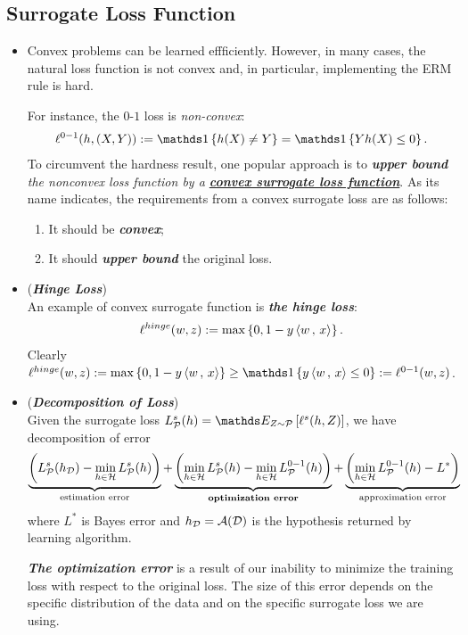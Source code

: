 \documentclass[11pt]{article}
\begin{document}
\subsection{Surrogate Loss Function}
\begin{itemize}
\item \begin{remark}
Convex problems can be learned effficiently. However, in many cases, the natural loss function is not convex and, in particular, implementing the ERM rule is hard.

For instance, the $0$-$1$ loss is \emph{non-convex}:
\begin{align*}
\ell^{0-1}(h, (X, Y)) :=\ind{h(X) \neq Y} = \ind{Yh(X) \le 0}.
\end{align*} To circumvent the hardness result, one popular approach is to \emph{\textbf{upper bound} the nonconvex loss function by a \underline{\textbf{convex surrogate loss function}}}. As its name indicates, the requirements from a convex surrogate loss are as follows:
\begin{enumerate}
\item It should be \textbf{\emph{convex}};
\item It should \emph{\textbf{upper bound}} the original loss.
\end{enumerate}
\end{remark}

\item \begin{example}(\textbf{\emph{Hinge Loss}})\\
An example of convex surrogate function is \emph{\textbf{the hinge loss}}:
\begin{align*}
\ell^{hinge}(w, z) := \max\left\{0, 1- y\left\langle w\,,\, x \right\rangle\right\}.
\end{align*} Clearly $\ell^{hinge}(w, z) := \max\set{0, 1- y\inn{w}{x}} \ge \ind{y\inn{w}{x} \le 0} := \ell^{0-1}(w, z)$.
\end{example}

\item \begin{remark}(\textbf{\emph{Decomposition of Loss}})\\
Given the surrogate loss $L_{\cP}^{s}(h) = \E{Z \sim \cP}{\ell^{s}(h, Z)}$, we have decomposition of error
\begin{align*}
 \underbrace{\left(L^{s}_{{\mathcal P}}(h_{{\mathcal D}}) - \min_{h \in {\mathcal H}}L^{s}_{{\mathcal P}}(h)\right)}_{\text{estimation error}} +\underbrace{\left(\min_{h \in {\mathcal H}}L^{s}_{{\mathcal P}}(h) - \min_{h \in {\mathcal H}}L^{0-1}_{{\mathcal P}}(h)\right)}_{\text{\textbf{optimization error}}}  +\underbrace{\left(\min_{h \in {\mathcal H}}L^{0-1}_{{\mathcal P}}(h) - L^{*}\right)}_{\text{approximation error}}  
\end{align*} where $L^{*}$ is Bayes error and  $h_{{\mathcal D}} = {\mathcal A}({\mathcal D})$ is the hypothesis returned by learning algorithm.

\emph{\textbf{The optimization error}} is a result of our inability to minimize the training loss with respect to the original loss. The size of this error depends on the specific distribution of the data and on the specific surrogate loss we are using.
\end{remark}
\end{itemize}
\end{document}
